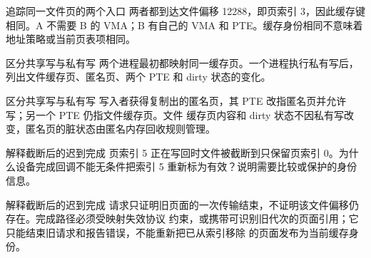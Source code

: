 \begin{chapteranswer}{追踪同一文件页的两个入口}
两者都到达文件偏移 12288，即页索引 3，因此缓存键相同。A 不需要 B 的 VMA；B 有自己的
VMA 和 PTE。缓存身份相同不意味着地址策略或当前页表项相同。
\end{chapteranswer}

\begin{chapterexercise}{区分共享写与私有写}
两个进程最初都映射同一缓存页。一个进程执行私有写后，列出文件缓存页、匿名页、两个 PTE
和 dirty 状态的变化。
\end{chapterexercise}

\begin{chapteranswer}{区分共享写与私有写}
写入者获得复制出的匿名页，其 PTE 改指匿名页并允许写；另一个 PTE 仍指文件缓存页。文件
缓存页内容和 dirty 状态不因私有写改变，匿名页的脏状态由匿名内存回收规则管理。
\end{chapteranswer}

\begin{chapterexercise}{解释截断后的迟到完成}
页索引 5 正在写回时文件被截断到只保留页索引 0。为什么设备完成回调不能无条件把索引 5
重新标为有效？说明需要比较或保护的身份信息。
\end{chapterexercise}

\begin{chapteranswer}{解释截断后的迟到完成}
请求只证明旧页面的一次传输结束，不证明该文件偏移仍存在。完成路径必须受映射失效协议
约束，或携带可识别旧代次的页面引用；它只能结束旧请求和报告错误，不能重新把已从索引移除
的页面发布为当前缓存身份。
\end{chapteranswer}
